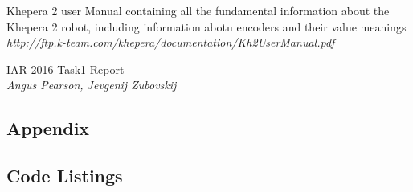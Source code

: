 \documentclass[11pt, a4paper]{article}
\begin{document}
\begin{thebibliography}{9}
\par{Khepera 2 user Manual containing all the fundamental information about the Khepera 2 robot, including information abotu encoders and their value meanings} \\
\textit{http://ftp.k-team.com/khepera/documentation/Kh2UserManual.pdf}

\par{IAR 2016 Task1 Report} \\
\textit{Angus Pearson, Jevgenij Zubovskij}

\end{thebibliography}

\newpage
\begin{appendices}
\section*{Appendix}
\subsection{Code Listings}










\end{appendices}
\end{document}
